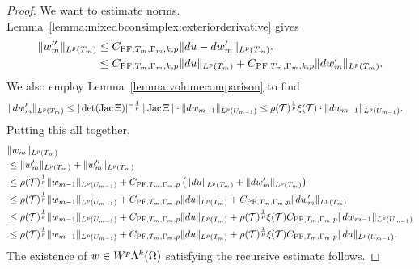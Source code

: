 \documentclass[12pt,a4paper]{article}
\begin{document}
\begin{proof}
    We want to estimate norms. 
    Lemma~\ref{lemma:mixedbconsimplex:exteriorderivative} gives 
    \begin{align*}
        \| w''_{m} \|_{L^{p}(T_{m})} 
        &
        \leq 
        C_{{\rm PF},T_{m},\Gamma_{m},k,p} \| d u - d w'_{m} \|_{L^{p}(T_{m})}.
        \\&
        \leq 
        C_{{\rm PF},T_{m},\Gamma_{m},k,p} \| d u      \|_{L^{p}(T_{m})} 
        + 
        C_{{\rm PF},T_{m},\Gamma_{m},k,p} \| d w'_{m} \|_{L^{p}(T_{m})} 
        .
    \end{align*}
    We also employ Lemma~\ref{lemma:volumecomparison} to find 
    \begin{align*}
        \| d w'_{m} \|_{L^{p}(T_{m})}
        &\leq 
        |\det(\operatorname{{\rm Jac}} \Xi  )|^{-\frac 1 p} 
        \| \operatorname{{\rm Jac}} \Xi   \|
        \cdot 
        \| d w_{m-1} \|_{L^{p}(U_{m-1})}
        \leq 
        \rho({\mathcal T})^{\frac 1 p} \xi({\mathcal T})
        \cdot 
        \| d w_{m-1} \|_{L^{p}(U_{m-1})}
        .
    \end{align*}
    Putting this all together, 
    \begin{align*}
        &
        \| w_{m} \|_{L^{p}(T_{m})}
        \\&
        \leq  
        \| w'_{m} \|_{L^{p}(T_{m})}
        + 
        \| w''_{m} \|_{L^{p}(T_{m})}
        \\&
        \leq  
        \rho({\mathcal T})^{\frac 1 p} 
        \| w_{m-1} \|_{L^{p}(U_{m-1})} 
        + 
        C_{{\rm PF},T_{m},\Gamma_{m},p} 
        \left( 
            \| d u \|_{L^{p}(T_{m})} 
            + 
            \| d w'_{m} \|_{L^{p}(T_{m})} 
        \right) 
        \\&
        \leq  
        \rho({\mathcal T})^{\frac 1 p} 
        \| w_{m-1} \|_{L^{p}(U_{m-1})} 
        + 
        C_{{\rm PF},T_{m},\Gamma_{m},p} 
        \| d u \|_{L^{p}(T_{m})} 
        + 
        C_{{\rm PF},T_{m},\Gamma_{m},p} 
        \| d w'_{m} \|_{L^{p}(T_{m})} 
        \\&
        \leq  
        \rho({\mathcal T})^{\frac 1 p} 
        \| w_{m-1} \|_{L^{p}(U_{m-1})} 
        + 
        C_{{\rm PF},T_{m},\Gamma_{m},p} 
        \| d u \|_{L^{p}(T_{m})} 
        + 
        \rho({\mathcal T})^{\frac 1 p} \xi({\mathcal T})
        C_{{\rm PF},T_{m},\Gamma_{m},p} 
        \| d w_{m-1} \|_{L^{p}(U_{m-1})} 
        \\&
        \leq  
        \rho({\mathcal T})^{\frac 1 p} 
        \| w_{m-1} \|_{L^{p}(U_{m-1})} 
        + 
        C_{{\rm PF},T_{m},\Gamma_{m},p} 
        \| d u \|_{L^{p}(T_{m})} 
        + 
        \rho({\mathcal T})^{\frac 1 p} \xi({\mathcal T})
        C_{{\rm PF},T_{m},\Gamma_{m},p} 
        \| d u \|_{L^{p}(U_{m-1})} 
        .
    \end{align*}
    The existence of $w \in W^{p}\Lambda^{k}(\Omega)$ satisfying the recursive estimate follows. 
\end{proof}
\end{document}
